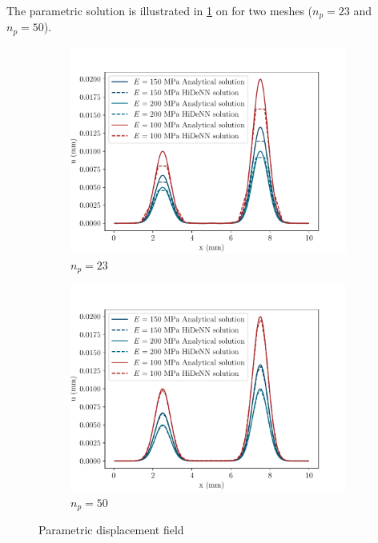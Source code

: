 The parametric solution is illustrated in \cref{fig:Para_disp} on for two meshes ($n_p=23$ and $n_p=50$).
\begin{figure}
\begin{subfigure}[t]{0.5\linewidth}
    \centering
    \includegraphics[width=\linewidth]{Figures/Para_displacements_np_23.pdf}
    \caption{$n_p=23$}
\end{subfigure}
  \begin{subfigure}[t]{0.5\linewidth}
    \centering
    \includegraphics[width=\linewidth]{Figures/Para_displacements_np_50.pdf}
    \caption{$n_p=50$}
\end{subfigure}  
    \caption{Parametric displacement field }
    \label{fig:Para_disp}
\end{figure}



